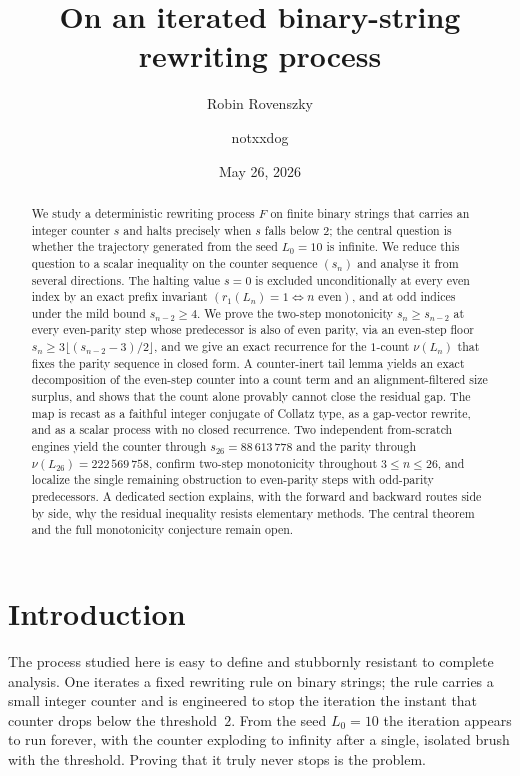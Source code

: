 \documentclass[11pt,reqno]{amsart}
\title[An iterated binary-string rewriting process]{On an iterated binary-string rewriting process}
\author{Robin Rovenszky}
\author{notxxdog}
\date{May 26, 2026}
\theoremstyle{plain}
\theoremstyle{definition}
\theoremstyle{remark}
\begin{document}
\begin{abstract}
We study a deterministic rewriting process $F$ on finite binary strings that carries an integer counter $s$ and halts precisely when $s$ falls below $2$; the central question is whether the trajectory generated from the seed $L_0=10$ is infinite.  We reduce this question to a scalar inequality on the counter sequence $(s_n)$ and analyse it from several directions.  The halting value $s=0$ is excluded unconditionally at every even index by an exact prefix invariant $(r_1(L_n)=1\iff n\text{ even})$, and at odd indices under the mild bound $s_{n-2}\ge 4$.  We prove the two-step monotonicity $s_n\ge s_{n-2}$ at every even-parity step whose predecessor is also of even parity, via an even-step floor $s_n\ge 3\lfloor(s_{n-2}-3)/2\rfloor$, and we give an exact recurrence for the $1$-count $\nu(L_n)$ that fixes the parity sequence in closed form.  A counter-inert tail lemma yields an exact decomposition of the even-step counter into a count term and an alignment-filtered size surplus, and shows that the count alone provably cannot close the residual gap.  The map is recast as a faithful integer conjugate of Collatz type, as a gap-vector rewrite, and as a scalar process with no closed recurrence.  Two independent from-scratch engines yield the counter through $s_{26}=88\,613\,778$ and the parity through $\nu(L_{26})=222\,569\,758$, confirm two-step monotonicity throughout $3\le n\le 26$, and localize the single remaining obstruction to even-parity steps with odd-parity predecessors.  A dedicated section explains, with the forward and backward routes side by side, why the residual inequality resists elementary methods.  The central theorem and the full monotonicity conjecture remain open.
\end{abstract}

\maketitle
\tableofcontents

\section{Introduction}
The process studied here is easy to define and stubbornly resistant to complete analysis. One iterates a fixed rewriting rule on binary strings; the rule carries a small integer counter and is engineered to stop the iteration the instant that counter drops below the threshold~$2$. From the seed $L_0=10$ the iteration appears to run forever, with the counter exploding to infinity after a single, isolated brush with the threshold. Proving that it truly never stops is the problem.
\end{document}
